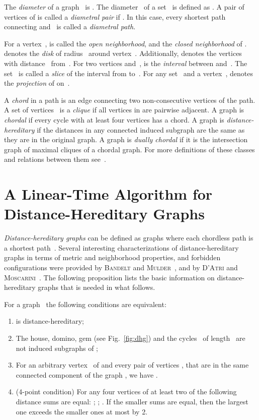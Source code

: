 \documentclass[10pt]{llncs}
\begin{document}
The \emph{diameter} of a graph~ is . 
The diameter~ of a set~ is defined as . 
A pair of vertices  of  is called a \emph{diametral  pair} if .
In this case, every shortest path connecting  and~ is called a \emph{diametral path}. 

For a vertex~,  is called the \emph{open neighborhood}, and  the \emph{closed neighborhood} of . 
 denotes the \emph{disk} of radius~ around vertex~. 
Additionally,  denotes the vertices with distance~ from~. 
For two vertices  and~,  is the \emph{interval} between  and~. 
The set~ is called a \emph{slice} of the interval from  to~. 
For any set~ and a vertex~,  denotes the \emph{projection} of  on~. 

A \emph{chord} in a path is an edge connecting two non-consecutive vertices of the path. 
A set of vertices~ is a \emph{clique} if all vertices in  are pairwise adjacent. 
A graph is \emph{chordal} if every cycle with at least four vertices has a chord. 
A graph is \emph{distance-hereditary} if the distances in any connected induced subgraph are the same as they are in the original graph. 
A graph is \emph{dually chordal} if it is the intersection graph of maximal cliques of a chordal graph.
For more definitions of these classes and relations between them see~\cite{BrLeSpinGraphClasses}.

\section{A Linear-Time Algorithm for Distance-Hereditary Graphs}
    \label{sec:DistHered}

\emph{Distance-hereditary graphs} can be defined as graphs where each chordless path is a shortest path~\cite{howorka}. 
Several interesting characterizations of distance-hereditary graphs in terms of metric and neighborhood properties, and forbidden configurations were provided by \textsc{Bandelt} and \textsc{Mulder}~\cite{BM-dhg}, and by \textsc{D'Atri} and \textsc{Moscarini}~\cite{D-AM-dhg}. 
The following proposition  lists  the basic information on distance-hereditary graphs that is needed in what follows. 

\begin{proposition}
    \label{prop:dhg} 
For a graph~ the following conditions are equivalent:
\begin{enumerate}[(1)]
    \item
         is distance-hereditary;
    \item
        The house, domino, gem (see Fig.~\ref{fig:dhg}) and the cycles~ of length~ are not induced subgraphs of ;
    \item
        For an arbitrary vertex~ of  and every pair of vertices , that are in the same connected component of the graph , we have .
    \item
        (4-point condition)
        For any four vertices  of  at least two of the following distance sums are equal:
        ; ; .
        If the smaller sums are equal, then the largest one exceeds the smaller ones at most by 2.
\end{enumerate}
\end{proposition}
\end{document}
